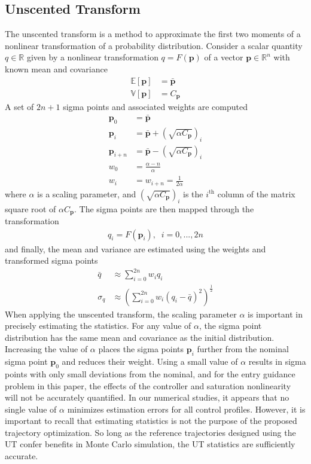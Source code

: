 \documentclass[journal ]{new-aiaa}
\newcommand{\param}{\ensuremath{\mathbf{p}}}
\newcommand{\E}[1]{\mathbb{E}\left[#1\right]}
\newcommand{\V}[1]{\mathbb{V}[#1]}
\newcommand{\cov}{C}
\begin{document}
\subsection*{Unscented Transform}
The unscented transform is a method to approximate the first two moments of a nonlinear transformation of a probability distribution. Consider a scalar quantity $q\in\mathbb{R}$ given by a nonlinear transformation $q = F(\param)$ of a vector $\param\in\mathbb{R}^n$ with known mean and covariance
\begin{align*}
\E{\param} &= \bar{\param}\\
\V{\param} &= \cov_{\param}
\end{align*}
A set of $2n+1$ sigma points and associated weights are computed 
\begin{align*}
\param_0 &= \bar{\param} \\
\param_i &=  \bar{\param} + \left(\sqrt{\alpha \cov_{\param}}\right)_i \\
\param_{i+n} &=  \bar{\param} - \left(\sqrt{\alpha\cov_{\param}}\right)_i \\
w_0 &= \frac{\alpha - n}{\alpha} \\
w_i &= w_{i+n} = \frac{1}{2\alpha}
\end{align*}
where $\alpha$ is a scaling parameter, and $\left(\sqrt{\alpha \cov_{\param}}\right)_i$ is the $i^{\mathrm{th}}$ column of the matrix square root of $\alpha \cov_{\param}$. The sigma points are then mapped through the transformation
\begin{align}
q_i = F(\param_i),\;\;i=0,...,2n
\end{align}
and finally, the mean and variance are estimated using the weights and transformed sigma points
\begin{align*}
\bar{q} &\approx \sum_{i=0}^{2n}w_iq_i\\
\sigma_{q} &\approx \left(\sum_{i=0}^{2n}w_i\left(q_i - \bar{q}\right)^2\right)^{\frac{1}{2}}
\end{align*}
When applying the unscented transform, the scaling parameter $\alpha$ is important in precisely estimating the statistics. For any value of $\alpha$, the sigma point distribution has the same mean and covariance as the initial distribution. Increasing the value of $\alpha$ places the sigma points $\param_i$ further from the nominal sigma point $\param_0$ and reduces their weight. Using a small value of $\alpha$ results in sigma points with only small deviations from the nominal, and for the entry guidance problem in this paper, the effects of the controller and saturation nonlinearity will not be accurately quantified. In our numerical studies, it appears that no single value of $\alpha$ minimizes estimation errors for all control profiles. However, it is important to recall that estimating statistics is not the purpose of the proposed trajectory optimization. So long as the reference trajectories designed using the UT confer benefits in Monte Carlo simulation, the UT statistics are sufficiently accurate. 
\end{document}
